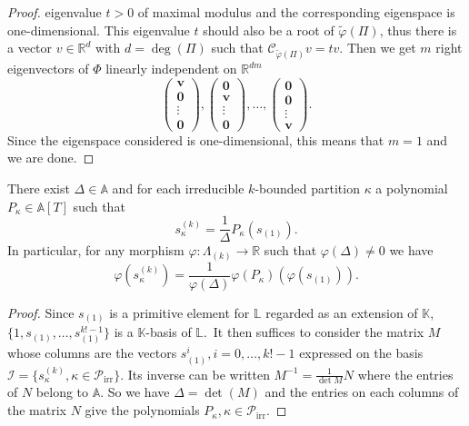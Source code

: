 \documentclass[ALCO,ThmDefs,Unicode,epreuves]{cedram}
\DeclareMathOperator{\irr}{irr}
\begin{document}
\begin{proof}
eigenvalue $t>0$ of maximal modulus and the corresponding eigenspace is
one-dimensional. This eigenvalue $t$ should also be a root of $\widetilde
{\varphi}(\Pi)$, thus there is a vector $v\in\mathbb{R}^{d}$ with $d=\deg
(\Pi)$ such that $\mathcal{C}_{\widetilde{\varphi}(\Pi)}v=tv$. Then we get $m$
right eigenvectors of $\Phi$ linearly independent on $\mathbb{R}^{dm}$%
\[
\left(
\begin{matrix}
\boldsymbol{v}\\
\boldsymbol{0}\\
\vdots\\
\boldsymbol{0}%
\end{matrix}
\right) ,\left(
\begin{matrix}
\boldsymbol{0}\\
\boldsymbol{v}\\
\vdots\\
\boldsymbol{0}%
\end{matrix}
\right) ,\ldots,\left(
\begin{matrix}
\boldsymbol{0}\\
\boldsymbol{0}\\
\vdots\\
\boldsymbol{v}%
\end{matrix}
\right) .
\]
Since the eigenspace considered is one-dimensional, this means that $m=1$ and
we are done.
\end{proof}

\begin{coro}
\label{Cor_Delta}There exist $\Delta\in\mathbb{A}$ and for each irreducible
$k$-bounded partition $\kappa$ a polynomial $P_{\kappa}\in\mathbb{A}[T]$ such
that
\[
s_{\kappa}^{(k)}=\frac{1}{\Delta}P_{\kappa}(s_{(1)}).
\]
In particular, for any morphism $\varphi:\Lambda_{(k)}\rightarrow\mathbb{R}$
such that $\varphi(\Delta)\neq0$ we have%
\[
\varphi(s_{\kappa}^{(k)})=\frac{1}{\varphi(\Delta)}\varphi(P_{\kappa}%
)(\varphi(s_{(1)})).
\]

\end{coro}

\begin{proof}
Since $s_{(1)}$ is a primitive element for $\mathbb{L}$ regarded as an
extension of $\mathbb{K}$, $\{1,s_{(1)},\ldots,s_{(1)}^{k!-1}\}$ is a
$\mathbb{K}$-basis of $\mathbb{L}$.\ It then suffices to consider the matrix
$M$ whose columns are the vectors $s_{(1)}^{i},i=0,\ldots,k!-1$ expressed on
the basis $\mathcal{I}=\{s_{\kappa}^{(k)},\kappa\in\mathcal{P}_{\irr %
}\}$. Its inverse can be written $M^{-1}=\frac{1}{\det M}N$ where the entries
of $N$ belong to $\mathbb{A}$. So we have $\Delta=\det(M)$ and the entries on
each columns of the matrix $N$ give the polynomials $P_{\kappa},\kappa
\in\mathcal{P}_{\irr }$.
\end{proof}
\end{document}
